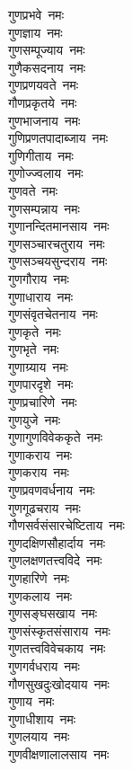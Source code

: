 \begin{multicols}{2}
\begin{flushleft}
गुणप्रभवे~नमः\\
गुणज्ञाय~नमः\\
गुणसम्पूज्याय~नमः\\
गुणैकसदनाय~नमः\\
गुणप्रणयवते~नमः\\
गौणप्रकृतये~नमः\\
गुणभाजनाय~नमः\\
गुणिप्रणतपादाब्जाय~नमः\\
गुणिगीताय~नमः\\
गुणोज्ज्वलाय~नमः\hfill{}\\
गुणवते~नमः\\
गुणसम्पन्नाय~नमः\\
गुणानन्दितमानसाय~नमः\\
गुणसञ्चारचतुराय~नमः\\
गुणसञ्चयसुन्दराय~नमः\\
गुणगौराय~नमः\\
गुणाधाराय~नमः\\
गुणसंवृतचेतनाय~नमः\\
गुणकृते~नमः\\
गुणभृते~नमः\hfill{}\\
गुणाग्र्याय~नमः\\
गुणपारदृशे~नमः\\
गुणप्रचारिणे~नमः\\
गुणयुजे~नमः\\
गुणागुणविवेककृते~नमः\\
गुणाकराय~नमः\\
गुणकराय~नमः\\
गुणप्रवणवर्धनाय~नमः\\
गुणगूढचराय~नमः\\
गौणसर्वसंसारचेष्टिताय~नमः\hfill{}\\
गुणदक्षिणसौहार्दाय~नमः\\
गुणलक्षणतत्त्वविदे~नमः\\
गुणहारिणे~नमः\\
गुणकलाय~नमः\\
गुणसङ्घसखाय~नमः\\
गुणसंस्कृतसंसाराय~नमः\\
गुणतत्त्वविवेचकाय~नमः\\
गुणगर्वधराय~नमः\\
गौणसुखदुःखोदयाय~नमः\\
गुणाय~नमः\hfill{}\\
गुणाधीशाय~नमः\\
गुणलयाय~नमः\\
गुणवीक्षणालालसाय~नमः\\

\end{flushleft}
\end{multicols}
